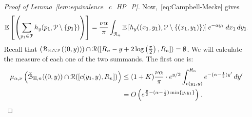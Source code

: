 \begin{proof}[Proof of Lemma~\ref{lem:equivalence_c_HP_P}]
Now,~\eqref{eq:Campbell-Mecke} gives
\begin{align*}
\mathbb{E}\left[\left( \sum_{p_1 \in {\mathcal P}} 
		h_y (p_1, {\mathcal P} \setminus \{ p_1 \})\right)\right] 
	=\frac{\nu \alpha}{\pi} \int_{{\mathcal R}_n} \mathbb{E}\left[h_y((x_1,y_1), {\mathcal P} \setminus \{(x_1,y_1)\})\right]
		e^{-\alpha y_1} \, dx_1 \, dy_1.
\end{align*}
Recall that $({\mathcal B}_{\mathbb{H} \bigtriangleup {\mathcal P}}\left((0,y)\right))\cap {\mathcal R}([R_n - y + 2 \log\left(\frac{\pi}{2}\right),R_n]) = \emptyset$. 
We will calculate the measure of each one of the two summands. The first one is:
\begin{align*}
	\mu_{\alpha,\nu}\left( \check{{\mathcal B}}_{\mathbb{H},n}((0,y)) \cap  {\mathcal R}([c(y_1,y), R_n])\right) 
	&\leq (1+ K) \frac{\nu \alpha}{\pi} \cdot e^{y/2}  \int_{c(y_1,y)}^{R_n} e^{-(\alpha - \frac{1}{2}) y'} \, dy' \\
	&=  O\left(e^{\frac{y}{2} - (\alpha-\frac{1}{2}) \min \{y,y_1\}}\right).
\end{align*}


\end{proof}
